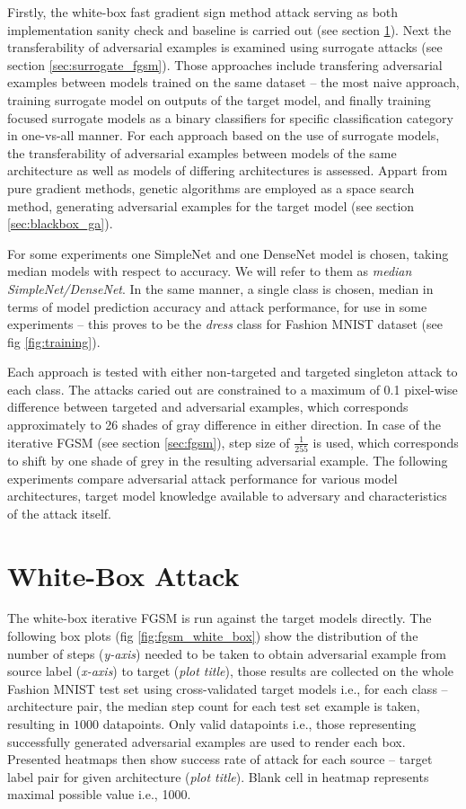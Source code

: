 Firstly, the white-box fast gradient sign method attack serving as both implementation sanity check and baseline is carried out (see section \ref{sec:whitebox_fgsm}). Next the transferability of adversarial examples is examined using surrogate attacks (see section \ref{sec:surrogate_fgsm}). Those approaches include transfering adversarial examples between models trained on the same dataset -- the most naive approach, training surrogate model on outputs of the target model, and finally training focused surrogate models as a binary classifiers for specific classification category in one-vs-all manner. For each approach based on the use of surrogate models, the transferability of adversarial examples between models of the same architecture as well as models of differing architectures is assessed. Appart from pure gradient methods, genetic algorithms are employed as a space search method, generating adversarial examples for the target model (see section \ref{sec:blackbox_ga}).

For some experiments one SimpleNet and one DenseNet model is chosen, taking median models with respect to accuracy. We will refer to them as \emph{median SimpleNet/DenseNet}. In the same manner, a single class is chosen, median in terms of model prediction accuracy and attack performance, for use in some experiments -- this proves to be the \emph{dress} class for Fashion MNIST dataset (see fig \ref{fig:training}).

Each approach is tested with either non-targeted and targeted singleton attack to each class. The attacks caried out are constrained to a maximum of 0.1 pixel-wise difference between targeted and adversarial examples, which corresponds approximately to 26 shades of gray difference in either direction. In case of the iterative FGSM (see section \ref{sec:fgsm}), step size of $\frac{1}{255}$ is used, which corresponds to shift by one shade of grey in the resulting adversarial example. The following experiments compare adversarial attack performance for various model architectures, target model knowledge available to adversary and characteristics of the attack itself.

\section{White-Box Attack}
\label{sec:whitebox_fgsm}
The white-box iterative FGSM is run against the target models directly. The following box plots (fig \ref{fig:fgsm_white_box}) show the distribution of the number of steps (\emph{y-axis}) needed to be taken to obtain adversarial example from source label (\emph{x-axis}) to target (\emph{plot title}), those results are collected on the whole Fashion MNIST test set using cross-validated target models i.e., for each class -- architecture pair, the median step count for each test set example is taken, resulting in $1000$ datapoints. Only valid datapoints i.e., those representing successfully generated adversarial examples are used to render each box. Presented heatmaps then show success rate of attack for each source -- target label pair for given architecture (\textit{plot title}). Blank cell in heatmap represents maximal possible value i.e., 1000.

